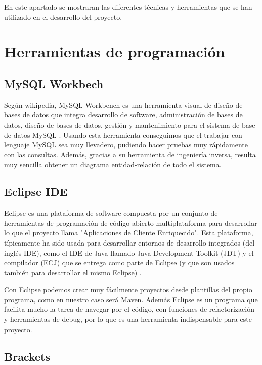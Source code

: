 
En este apartado se mostraran las diferentes técnicas y herramientas que se han utilizado en el desarrollo del proyecto.

\section{Herramientas de programación}

\subsection{MySQL Workbech}

Según wikipedia, MySQL Workbench es una herramienta visual de diseño de bases de datos que integra desarrollo de software, administración de bases de datos, diseño de bases de datos, gestión y mantenimiento para el sistema de base de datos MySQL \cite{wiki:Workbench}. Usando esta herramienta conseguimos que el trabajar con lenguaje MySQL sea muy llevadero, pudiendo hacer pruebas muy rápidamente con las consultas. Además, gracias a su herramienta de ingeniería inversa, resulta muy sencilla obtener un diagrama entidad-relación de todo el sistema.

\subsection{Eclipse IDE}

Eclipse es una plataforma de software compuesta por un conjunto de herramientas de programación de código abierto multiplataforma para desarrollar lo que el proyecto llama "Aplicaciones de Cliente Enriquecido". Esta plataforma, típicamente ha sido usada para desarrollar entornos de desarrollo integrados (del inglés IDE), como el IDE de Java llamado Java Development Toolkit (JDT) y el compilador (ECJ) que se entrega como parte de Eclipse (y que son usados también para desarrollar el mismo Eclipse) \cite{wiki:Eclipse}.

Con Eclipse podemos crear muy fácilmente proyectos desde plantillas del propio programa, como en nuestro caso será Maven. Además Eclipse es un programa que facilita mucho la tarea de navegar por el código, con funciones de refactorización y herramientas de debug, por lo que es una herramienta indispensable para este proyecto.

\subsection{Brackets}

